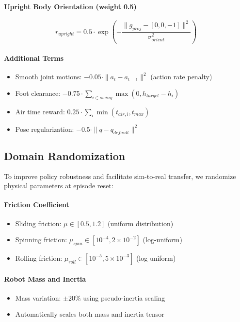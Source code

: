 \documentclass[12pt,a4paper]{article}
\begin{document}
\paragraph{Upright Body Orientation (weight 0.5)}
\begin{equation}
r_{upright} = 0.5 \cdot \exp\left(-\frac{\|g_{proj} - [0,0,-1]\|^2}{\sigma_{orient}^2}\right)
\end{equation}

\paragraph{Additional Terms}
\begin{itemize}
    \item Smooth joint motions: $-0.05 \cdot \|a_t - a_{t-1}\|^2$ (action rate penalty)
    \item Foot clearance: $-0.75 \cdot \sum_{i \in swing} \max(0, h_{target} - h_i)$
    \item Air time reward: $0.25 \cdot \sum_{i} \min(t_{air,i}, t_{max})$
    \item Pose regularization: $-0.5 \cdot \|q - q_{default}\|^2$
\end{itemize}

\subsection{Domain Randomization}

To improve policy robustness and facilitate sim-to-real transfer, we randomize physical parameters at episode reset:

\paragraph{Friction Coefficient}
\begin{itemize}
    \item Sliding friction: $\mu \in [0.5, 1.2]$ (uniform distribution)
    \item Spinning friction: $\mu_{spin} \in [10^{-4}, 2 \times 10^{-2}]$ (log-uniform)
    \item Rolling friction: $\mu_{roll} \in [10^{-5}, 5 \times 10^{-3}]$ (log-uniform)
\end{itemize}

\paragraph{Robot Mass and Inertia}
\begin{itemize}
    \item Mass variation: $\pm 20\%$ using pseudo-inertia scaling
    \item Automatically scales both mass and inertia tensor
\end{itemize}
\end{document}
